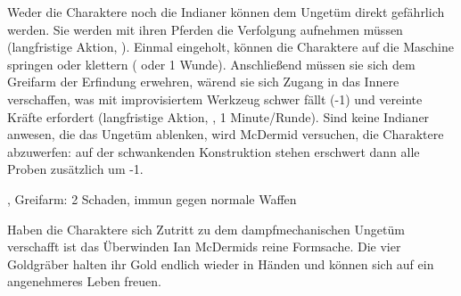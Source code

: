 {		Weder die Charaktere noch die Indianer können dem Ungetüm direkt gefährlich werden. Sie werden mit ihren Pferden die Verfolgung aufnehmen müssen (langfristige Aktion, ). Einmal eingeholt, können die Charaktere auf die Maschine springen oder klettern ( oder 1 Wunde). Anschließend müssen sie sich dem Greifarm der Erfindung erwehren, wärend sie sich Zugang in das Innere verschaffen, was mit improvisiertem Werkzeug schwer fällt (-1) und vereinte Kräfte erfordert (langfristige Aktion, , 1 Minute/Runde). Sind keine Indianer anwesen, die das Ungetüm ablenken, wird McDermid versuchen, die Charaktere abzuwerfen: auf der schwankenden Konstruktion stehen erschwert dann alle Proben zusätzlich um -1.

		, Greifarm: 2 Schaden, immun gegen normale Waffen



		\noindent
		Haben die Charaktere sich Zutritt zu dem dampfmechanischen Ungetüm verschafft ist das Überwinden Ian McDermids reine Formsache. Die vier Goldgräber halten ihr Gold endlich wieder in Händen und können sich auf ein angenehmeres Leben freuen.
}
